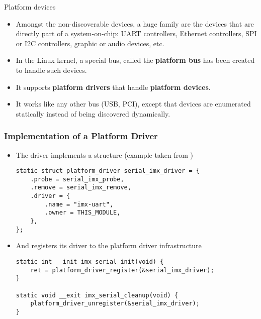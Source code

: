 \begin{frame}{Platform devices}
  \begin{itemize}
  \item Amongst the non-discoverable devices, a huge family are the
    devices that are directly part of a system-on-chip: UART
    controllers, Ethernet controllers, SPI or I2C controllers, graphic
    or audio devices, etc.
  \item In the Linux kernel, a special bus, called the {\bf platform
      bus} has been created to handle such devices.
  \item It supports {\bf platform drivers} that handle {\bf platform
      devices}.
  \item It works like any other bus (USB, PCI), except that devices
    are enumerated statically instead of being discovered dynamically.
  \end{itemize}
\end{frame}

\begin{frame}[fragile]
  \frametitle{Implementation of a Platform Driver}
  \begin{itemize}
  \item The driver implements a 
    structure (example taken from )
    \begin{verbatim}
static struct platform_driver serial_imx_driver = {
    .probe = serial_imx_probe,
    .remove = serial_imx_remove,
    .driver = {
        .name = "imx-uart",
        .owner = THIS_MODULE,
    },
};
    \end{verbatim}
\item And registers its driver to the platform driver infrastructure
  \begin{verbatim}
static int __init imx_serial_init(void) {
    ret = platform_driver_register(&serial_imx_driver);
}

static void __exit imx_serial_cleanup(void) {
    platform_driver_unregister(&serial_imx_driver);
}
  \end{verbatim}
\end{itemize}
\end{frame}

